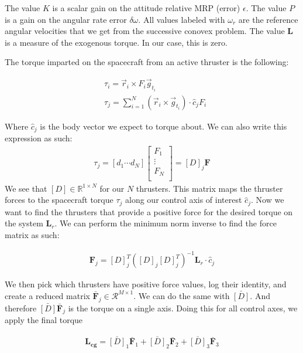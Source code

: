 The value $K$ is a scalar gain on the attitude relative MRP (error) $\epsilon$. The value $P$ is a gain on the angular rate error $\delta\omega$. All values labeled with $\omega_{r}$ are the reference angular velocities that we get from the successive conovex problem. The value $\mathbf{L}$ is a measure of the exogenous torque. In our case, this is zero.

The torque imparted on the spacecraft from an active thruster is the following:

\begin{align}
& \tau_i = \vec{r}_i \times F_i \vec{g}_{t_i} \\
& \tau_j = \sum _{i=1}^{N} (\vec{r}_i \times \vec{g}_{t_i}) \cdot \hat{c}_j F_i
\end{align}

Where $\hat{c}_j$ is the body vector we expect to torque about. We can also write this expression as such:
\begin{align}
\tau_j = \left[ d_1 \cdots d_N \right]
	\begin{bmatrix}
		F_1 \\
		\vdots \\
		F_N \\
 	\end{bmatrix}
= \left[D\right]_j\mathbf{F}
\end{align}
We see that $\left[D\right] \in \mathbb{R}^{1\times N}$ for our $N$ thrusters. This matrix maps the thruster forces to the spacecraft torque $\tau_j$ along our control axis of interest $\hat{c}_j$. Now we want to find the thrusters that provide a positive force for the desired torque on the system $\mathbf{L}_r$. We can perform the minimum norm  inverse to find the force matrix as such:

\begin{align}
\mathbf{F}_j = \left[D\right]_j^T (\left[D\right]_j \left[D\right]_j^T)^{-1}
\mathbf{L}_r \cdot \hat{c}_j
\end{align}

We then pick which thrusters have positive force values, log their identity, and create a reduced matrix $\bar{\mathbf{F}}_j \in \mathcal{R}^{M\times1}$. We can do the same with $\bar{\left[D\right]}$. And therefore $\bar{\left[D\right]}\bar{\mathbf{F}}_j$ is the torque on a single axis. Doing this for all control axes, we apply the final torque 

\begin{align}
\mathbf{L_{cg}} = \bar{\left[D\right]}_1\bar{\mathbf{F}}_1 + \bar{\left[D\right]}_2\bar{\mathbf{F}}_2 + \bar{\left[D\right]}_3\bar{\mathbf{F}}_3
\end{align}

